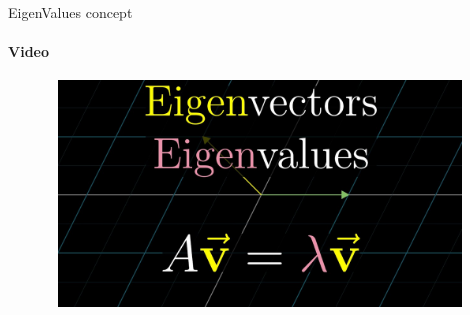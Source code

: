 \documentclass[aspectratio=169]{beamer}
\begin{document}

\begin{frame}[t]{EigenValues concept}
    \framesubtitle{Video}
    \vspace{-0.6cm}
    \begin{figure}[H]
        \href{https://youtu.be/PFDu9oVAE-g}{
            \centering\includegraphics[height=6cm,width=1\textwidth,keepaspectratio]{eigenvideo_brown.jpg}}
        \label{fig:eigenvideo_brown.jpg}
    \end{figure}
\end{frame}
\end{document}
